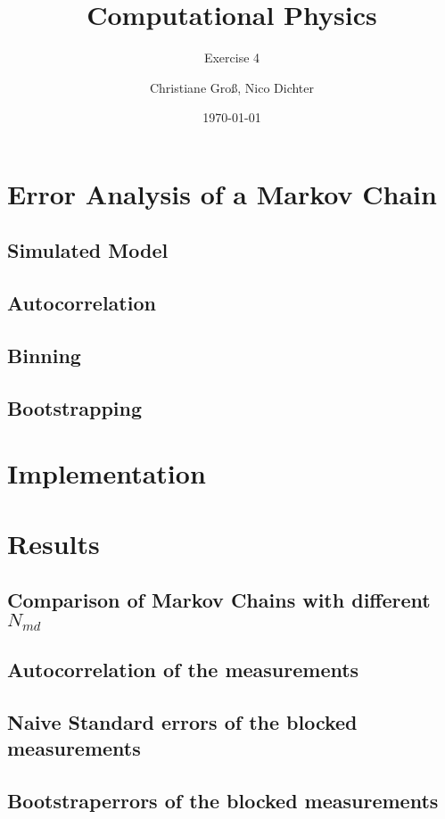 \documentclass{scrartcl}
\title{Computational Physics}
\subtitle{Exercise 4}
\date{\today}
\author{Christiane Groß, Nico Dichter}
\begin{document}
	\maketitle
\section{Error Analysis of a Markov Chain}
\subsection{Simulated Model}
\subsection{Autocorrelation}
\subsection{Binning}
\subsection{Bootstrapping}

\section{Implementation}

\section{Results}

\subsection{Comparison of Markov Chains with different $N_{md}$}

\subsection{Autocorrelation of the measurements}

\subsection{Naive Standard errors of the blocked measurements}

\subsection{Bootstraperrors of the blocked measurements}
\newpage	
\listoffigures
\printbibliography
\end{document}
